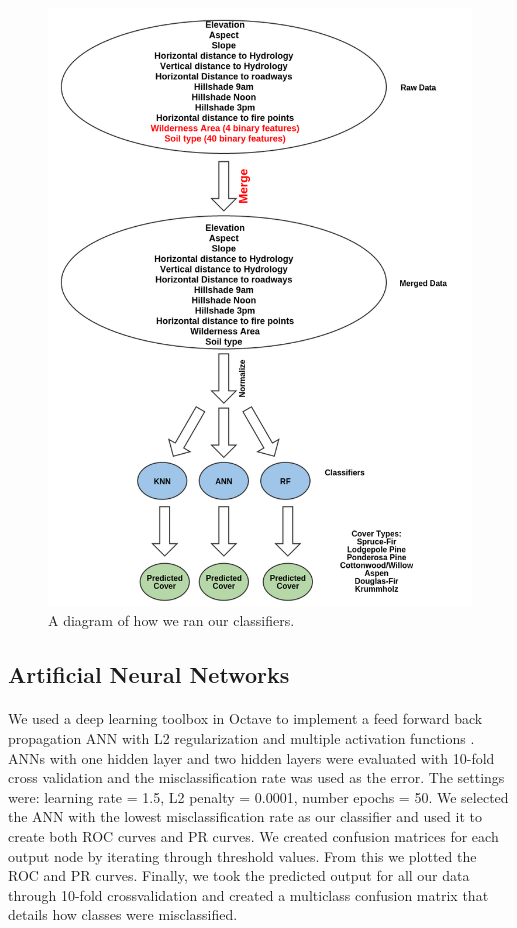 \documentclass[12pt]{article}
\begin{document}
\begin{figure}[H]
\caption{A diagram of how we ran our classifiers.}
\includegraphics[width=\linewidth]{images/flow.png}
\end{figure}


\subsection{Artificial Neural Networks}
\paragraph{}
We used a deep learning toolbox in Octave to implement a feed forward back propagation ANN with L2 regularization and multiple activation functions \cite{rbp12}.  ANNs with one hidden layer and two hidden layers were evaluated with 10-fold cross validation and the misclassification rate was used as the error. The settings were: learning rate = 1.5, L2 penalty = 0.0001, number epochs = 50. We selected the ANN with the lowest misclassification rate as our classifier and used it to create both ROC curves and PR curves.  We created confusion matrices for each output node by iterating through threshold values.  From this we plotted the ROC and PR curves.  Finally, we took the predicted output for all our data through 10-fold crossvalidation and created a multiclass confusion matrix that details how classes were misclassified.
\end{document}
